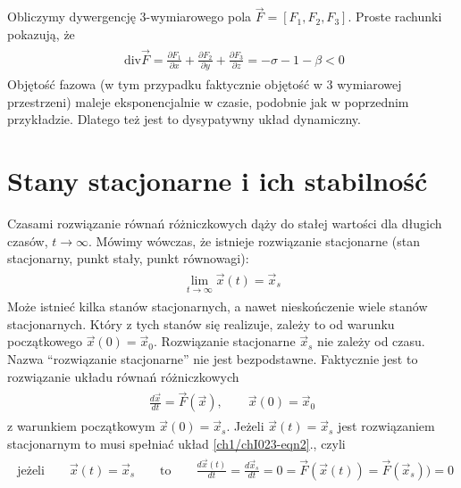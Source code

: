 \documentclass[a4paper,12pt,polish]{sphinxmanual}
\begin{document}
Obliczymy  dywergencję 3-wymiarowego pola $\vec F = [F_1, F_2, F_3]$. Proste rachunki pokazują, że
\label{ch1/chI022:equation-eqn43}\begin{gather}
\begin{split}\mbox{ div} \vec F =  \frac{\partial F_1}{\partial x} + \frac{\partial F_2}{\partial y}   + \frac{\partial F_3}{\partial z}  = -\sigma -1 - \beta <0\end{split}\label{ch1/chI022-eqn43}
\end{gather}
Objętość fazowa (w tym przypadku faktycznie objętość w 3 wymiarowej przestrzeni) maleje  eksponencjalnie w czasie, podobnie jak w poprzednim przykładzie.  Dlatego też jest to dysypatywny układ dynamiczny.


\section{Stany stacjonarne i ich stabilność}
\label{ch1/chI023:stany-stacjonarne-i-ich-stabilnosc}\label{ch1/chI023::doc}
Czasami rozwiązanie równań różniczkowych dąży do stałej wartości dla długich czasów, $t\to \infty$. Mówimy wówczas, że istnieje rozwiązanie stacjonarne (stan stacjonarny, punkt stały, punkt równowagi):
\label{ch1/chI023:equation-eqn1}\begin{gather}
\begin{split}\lim_{t \to \infty}  \vec x(t) = \vec x_s\end{split}\label{ch1/chI023-eqn1}
\end{gather}
Może istnieć kilka stanów stacjonarnych, a nawet nieskończenie wiele stanów stacjonarnych. Który z tych stanów się realizuje,  zależy to od warunku początkowego $\vec x(0) = \vec x_0$. Rozwiązanie stacjonarne $\vec x_s$ nie zależy od czasu. Nazwa ``rozwiązanie stacjonarne'' nie jest bezpodstawne. Faktycznie jest to rozwiązanie układu równań  różniczkowych
\label{ch1/chI023:equation-eqn2}\begin{gather}
\begin{split}\frac{d\vec x}{dt} = \vec F(\vec x), \quad \quad \vec x(0)  = \vec x_0\end{split}\label{ch1/chI023-eqn2}
\end{gather}
z warunkiem początkowym $\vec x(0) = \vec x_s$. Jeżeli  $\vec x(t) = \vec x_s$ jest rozwiązaniem stacjonarnym to musi spełniać układ \eqref{ch1/chI023-eqn2}., czyli
\label{ch1/chI023:equation-eqn3}\begin{gather}
\begin{split}\mbox{jeżeli}  \quad \quad \vec x(t) = \vec x_s \quad \quad\mbox{to} \quad \quad\frac{d\vec x(t)}{dt} = \frac{d\vec x_s}{dt}=0 = \vec F(\vec x(t)) = \vec F(\vec x_s)) = 0\end{split}\label{ch1/chI023-eqn3}
\end{gather}
\end{document}
